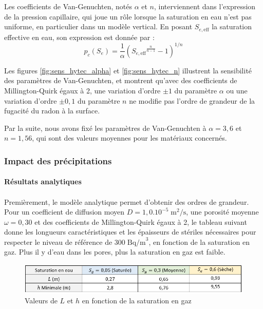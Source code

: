 \documentclass{article}
\begin{document}
Les coefficients de Van-Genuchten, notés $\alpha$ et $n$, interviennent dans l’expression de la pression capillaire, qui joue un rôle lorsque la saturation en eau n’est pas uniforme, en particulier dans un modèle vertical. En posant $S_{e,\text{eff}}$ la saturation effective en eau, son expression est donnée par :
$$
p_c (S_e)= \dfrac{1}{\alpha} \left( {S_{e,\text{eff}} }^{\frac{n}{n-1}} -1 \right)^{1/n}
$$

Les figures \ref{fig:sens_hytec_alpha} et \ref{fig:sens_hytec_n} illustrent la sensibilité des paramètres de Van-Genuchten, et montrent qu'avec des coefficients de Millington-Quirk égaux à 2, une variation d’ordre $\pm 1$ du paramètre $\alpha$ ou une variation d’ordre $\pm 0,1$ du paramètre $n$ ne modifie pas l’ordre de grandeur de la fugacité du radon à la surface.

Par la suite, nous avons fixé les paramètres de Van-Genuchten à $\alpha = 3,6$ et $n=1,56$, qui sont des valeurs moyennes pour les matériaux concernés.

\newpage
\subsubsection{Impact des précipitations}

\paragraph{Résultats analytiques}

\paragraph{} Premièrement, le modèle analytique permet d'obtenir des ordres de grandeur. Pour un coefficient de diffusion moyen $D=1,0.10^{-5} \; \text{m}^2/\text{s}$, une porosité moyenne $\omega=0,30$ et des coefficients de Millington-Quirk égaux à 2, le tableau suivant donne les longueurs caractéristiques et les épaisseurs de stériles nécessaires pour respecter le niveau de référence de $300\; \text{Bq/m}^3$, en fonction de la saturation en gaz. Plus il y d’eau dans les pores, plus la saturation en gaz est faible.

\begin{figure}[H]
    \centering
    \includegraphics[width = \linewidth]{III_C_4.png}
    \caption{Valeurs de $L$ et $h$ en fonction de la saturation en gaz}
    \label{fig:tableau_saturation}
\end{figure}
\end{document}
